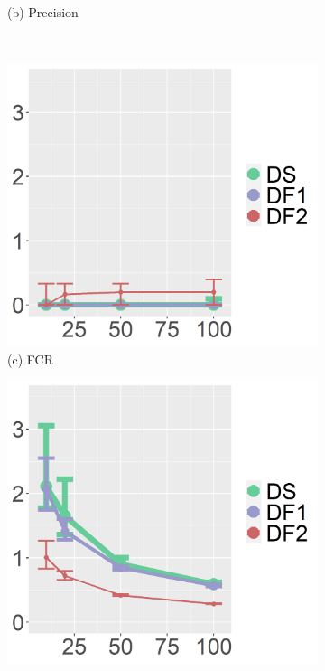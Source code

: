 \begin{figure}[ht!]
\begin{subfigure}[b]{.40\columnwidth}
    \caption{(b) Precision}
\end{subfigure}
\\
\centering
\begin{subfigure}[b]{.40\columnwidth} 
    \includegraphics[width=\columnwidth]{../../plot/FCR_1_IQR.png}
    \caption{(c) FCR}
\end{subfigure}
\hfill
\centering
\begin{subfigure}[b]{.40\columnwidth} 
    \includegraphics[width=\columnwidth]{../../plot/len_1_IQR.png}

\end{subfigure}
\end{figure}
